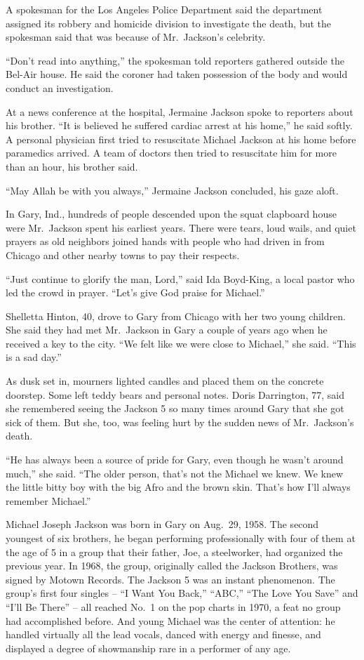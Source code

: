 ﻿\documentclass[12pt]{article}
\begin{document}
A spokesman for the Los Angeles Police Department said the department assigned its robbery and
homicide division to investigate the death, but the spokesman said that was because of Mr.~Jackson's
celebrity.

``Don't read into anything,'' the spokesman told reporters gathered outside the Bel-Air house. He
said the coroner had taken possession of the body and would conduct an investigation.

At a news conference at the hospital, Jermaine Jackson spoke to reporters about his brother. ``It is
believed he suffered cardiac arrest at his home,'' he said softly. A personal physician first tried
to resuscitate Michael Jackson at his home before paramedics arrived. A team of doctors then tried
to resuscitate him for more than an hour, his brother said.

``May Allah be with you always,'' Jermaine Jackson concluded, his gaze aloft.

In Gary, Ind., hundreds of people descended upon the squat clapboard house were Mr.~Jackson spent
his earliest years. There were tears, loud wails, and quiet prayers as old neighbors joined hands
with people who had driven in from Chicago and other nearby towns to pay their respects.

``Just continue to glorify the man, Lord,'' said Ida Boyd-King, a local pastor who led the crowd in
prayer. ``Let's give God praise for Michael.''

Shelletta Hinton, 40, drove to Gary from Chicago with her two young children. She said they had met
Mr.~Jackson in Gary a couple of years ago when he received a key to the city. ``We felt like we were
close to Michael,'' she said. ``This is a sad day.''

As dusk set in, mourners lighted candles and placed them on the concrete doorstep. Some left teddy
bears and personal notes. Doris Darrington, 77, said she remembered seeing the Jackson 5 so many
times around Gary that she got sick of them. But she, too, was feeling hurt by the sudden news of
Mr.~Jackson's death.

``He has always been a source of pride for Gary, even though he wasn't around much,'' she said.
``The older person, that's not the Michael we knew. We knew the little bitty boy with the big Afro
and the brown skin. That's how I'll always remember Michael.''

Michael Joseph Jackson was born in Gary on Aug.~29, 1958. The second youngest of six brothers, he
began performing professionally with four of them at the age of 5 in a group that their father, Joe,
a steelworker, had organized the previous year. In 1968, the group, originally called the Jackson
Brothers, was signed by Motown Records. The Jackson 5 was an instant phenomenon. The group's first
four singles -- ``I Want You Back,'' ``ABC,'' ``The Love You Save'' and ``I'll Be There'' -- all
reached No.~1 on the pop charts in 1970, a feat no group had accomplished before. And young Michael
was the center of attention: he handled virtually all the lead vocals, danced with energy and
finesse, and displayed a degree of showmanship rare in a performer of any age.
\end{document}
